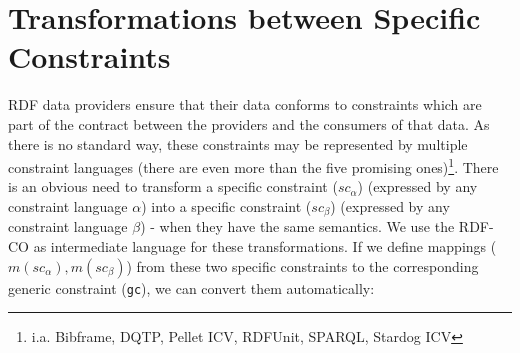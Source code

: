 \documentclass{llncs}
\newcommand{\ms}[1]{\texttt{#1}}
\newenvironment{DL}{
  \vspace{0.3cm}
	\begin{center}
  \begin{tabular}{r l}

}{
  \end{tabular}
	\end{center}
}
\begin{document}
%
%
%

\section{Transformations between Specific Constraints}
\label{sec:transformations}

RDF data providers ensure that their data conforms to constraints which are part of the contract between the providers and the consumers of that data.
As there is no standard way, these constraints may be represented by multiple constraint languages (there are even more than the five promising ones)\footnote{i.a. Bibframe, DQTP, Pellet ICV, RDFUnit, SPARQL, Stardog ICV}.
There is an obvious need to transform a specific constraint (\ms{$sc_{\alpha}$}) (expressed by any constraint language \ms{$\alpha$}) into a specific constraint (\ms{$sc_{\beta}$}) (expressed by any constraint language \ms{$\beta$}) - when they have the same semantics.
We use the RDF-CO as intermediate language for these transformations.
If we define mappings ($m(sc_{\alpha}), m(sc_{\beta})$) from these two specific constraints to the corresponding generic constraint (\ms{gc}),
we can convert them automatically:
\end{document}
